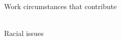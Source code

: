 \documentclass[aspectratio=169]{beamer}
\begin{document}
\begin{frame}
  \begin{center}
    \Huge Work circumstances that contribute
    \small
    \\ \small \cite{hh15}
    \\ \small \cite{clark14}
  \end{center}
\end{frame}

\begin{frame}
  \begin{center}
    \Huge Racial issues
    \\ \small \cite{colour}
  \end{center}
\end{frame}
\end{document}
